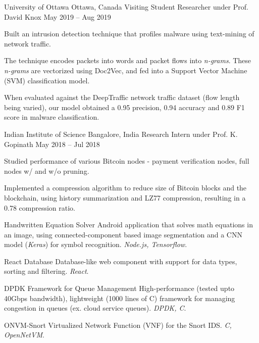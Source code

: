 \documentclass[10pt,a4paper]{article}
\begin{document}
\headedsection
{University of Ottawa}
{Ottawa, Canada}
{Visiting Student Researcher under Prof. David Knox}
{May 2019 -- Aug 2019}{
	\begin{circlist}
		\item Built an intrusion detection technique that profiles malware using text-mining of network traffic.
		\item The technique encodes packets into words and packet flows into \textit{n-grams}. These \textit{n-grams} are vectorized using Doc2Vec, and fed into a Support Vector Machine (SVM) classification model.
		\item When evaluated against the DeepTraffic network traffic dataset (flow length being varied), our model obtained a 0.95 precision, 0.94 accuracy and 0.89 F1 score in malware classification.
	\end{circlist}
}

\headedsection
{Indian Institute of Science}
{Bangalore, India}
{Research Intern under Prof. K. Gopinath}
{May 2018 -- Jul 2018}{
	\begin{circlist}
		\item Studied performance of various Bitcoin nodes - payment verification nodes, full nodes w/ and w/o pruning.
		\item Implemented a compression algorithm to reduce size of Bitcoin blocks and the blockchain, using history summarization and LZ77 compression, resulting in a 0.78 compression ratio.
	\end{circlist}
}


\headedsectiontwo
{Handwritten Equation Solver}{}{}
{
	Android application that solves math equations in an image, using connected-component based image segmentation and a CNN model (\textit{Keras}) for symbol recognition. \textit{Node.js, Tensorflow}.
}

\headedsectiontwo
{React Database}{}{}
{
	Database-like web component with support for data types, sorting and filtering. \textit{React}.
}

\headedsectiontwo
{DPDK Framework for Queue Management}{}{}
{
	High-performance (tested upto 40Gbps bandwidth), lightweight (1000 lines of C) framework for managing congestion in queues (ex. cloud service queues). \textit{DPDK, C}.
}

\headedsectiontwo
{ONVM-Snort}{}{}
{
	Virtualized Network Function (VNF) for the Snort IDS. \textit{C, OpenNetVM}.
}
\end{document}
